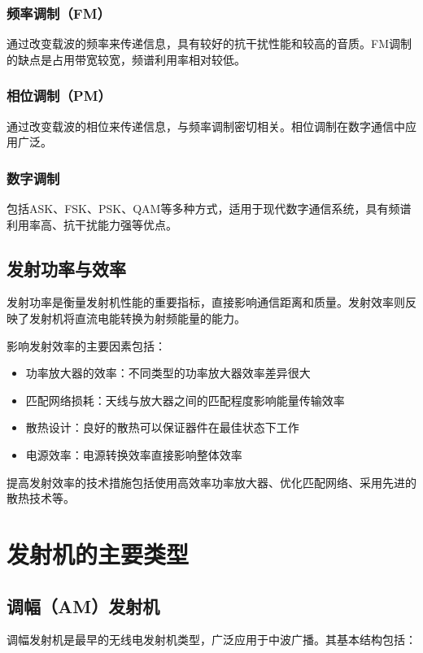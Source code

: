 \documentclass[12pt,UTF8]{ctexbook}
\begin{document}
\subsubsection{频率调制（FM）}
通过改变载波的频率来传递信息，具有较好的抗干扰性能和较高的音质。FM调制的缺点是占用带宽较宽，频谱利用率相对较低。

\subsubsection{相位调制（PM）}
通过改变载波的相位来传递信息，与频率调制密切相关。相位调制在数字通信中应用广泛。

\subsubsection{数字调制}
包括ASK、FSK、PSK、QAM等多种方式，适用于现代数字通信系统，具有频谱利用率高、抗干扰能力强等优点。

\subsection{发射功率与效率}

发射功率是衡量发射机性能的重要指标，直接影响通信距离和质量。发射效率则反映了发射机将直流电能转换为射频能量的能力。

影响发射效率的主要因素包括：
\begin{itemize}[leftmargin=3.5em]
    \item 功率放大器的效率：不同类型的功率放大器效率差异很大
    \item 匹配网络损耗：天线与放大器之间的匹配程度影响能量传输效率
    \item 散热设计：良好的散热可以保证器件在最佳状态下工作
    \item 电源效率：电源转换效率直接影响整体效率
\end{itemize}

提高发射效率的技术措施包括使用高效率功率放大器、优化匹配网络、采用先进的散热技术等。

\section{发射机的主要类型}

\subsection{调幅（AM）发射机}

调幅发射机是最早的无线电发射机类型，广泛应用于中波广播。其基本结构包括：
\end{document}
